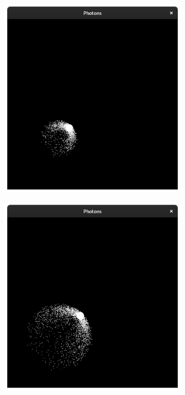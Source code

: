 \documentclass{stdlocal}
\begin{document}
\begin{figure}[p]
\begin{subfigure}[b]{0.24\textwidth}
      \end{subfigure}
      \begin{subfigure}[b]{0.24\textwidth}
        \center
        \includegraphics[width=\textwidth,trim={0 0 0 2cm},clip]{images/photons_1_03.png}
      \end{subfigure}
      \begin{subfigure}[b]{0.24\textwidth}
        \center
        \includegraphics[width=\textwidth,trim={0 0 0 2cm},clip]{images/photons_1_04.png}

\end{subfigure}
\end{figure}
\end{document}
